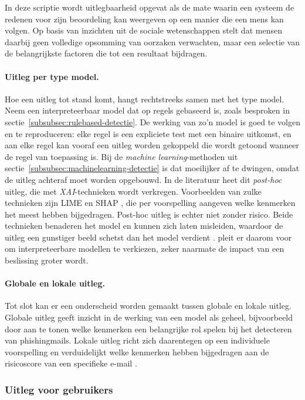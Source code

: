 In deze scriptie wordt uitlegbaarheid opgevat als de mate waarin een systeem de redenen voor zijn beoordeling kan weergeven op een manier die een mens kan volgen. Op basis van inzichten uit de sociale wetenschappen stelt \textcite{Miller2017} dat mensen daarbij geen volledige opsomming van oorzaken verwachten, maar een selectie van de belangrijkste factoren die tot een resultaat bijdragen.

\paragraph{Uitleg per type model.}
Hoe een uitleg tot stand komt, hangt rechtstreeks samen met het type model. Neem een interpreteerbaar model dat op regels gebaseerd is, zoals besproken in sectie~\ref{subsubsec:rulebased-detectie}. De werking van zo'n model is goed te volgen en te reproduceren: elke regel is een expliciete test met een binaire uitkomst, en aan elke regel kan vooraf een uitleg worden gekoppeld die wordt getoond wanneer de regel van toepassing is. Bij de \emph{machine learning}-methoden uit sectie~\ref{subsubsec:machinelearning-detectie} is dat moeilijker af te dwingen, omdat de uitleg achteraf moet worden opgebouwd. In de literatuur heet dit \emph{post-hoc} uitleg, die met \emph{XAI}-technieken wordt verkregen.
Voorbeelden van zulke technieken zijn LIME \autocite{Ribeiro2016} en SHAP \autocite{Lundberg2017}, die per voorspelling aangeven welke kenmerken het meest hebben bijgedragen. Post-hoc uitleg is echter niet zonder risico. Beide technieken benaderen het model en kunnen zich laten misleiden, waardoor de uitleg een gunstiger beeld schetst dan het model verdient \autocite{Slack2019}. \textcite{Rudin2019} pleit er daarom voor om interpreteerbare modellen te verkiezen, zeker naarmate de impact van een beslissing groter wordt.

\paragraph{Globale en lokale uitleg.}
Tot slot kan er een onderscheid worden gemaakt tussen globale en lokale uitleg. Globale uitleg geeft inzicht in de werking van een model als geheel, bijvoorbeeld door aan te tonen welke kenmerken een belangrijke rol spelen bij het detecteren van phishingmails. Lokale uitleg richt zich daarentegen op een individuele voorspelling en verduidelijkt welke kenmerken hebben bijgedragen aan de risicoscore van een specifieke e-mail \autocite{Guidotti2018}.

\subsubsection{Uitleg voor gebruikers}
\label{subsubsec:uitleg-voor-gebruikers}


